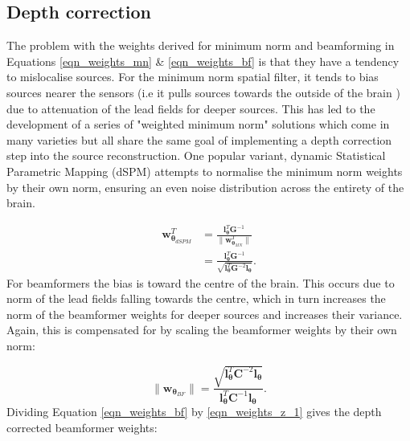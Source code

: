\subsection{Depth correction}\label{sub_depthcorrection}

The problem with the weights derived for minimum norm and beamforming in Equations \ref{eqn_weights_mn} \& \ref{eqn_weights_bf} is that they have a tendency to mislocalise sources. For the minimum norm spatial filter, it tends to bias sources nearer the sensors (i.e it pulls sources towards the outside of the brain \citep{Fuchs1999,Lin2006}) due to attenuation of the lead fields for deeper sources. This has led to the development of a series of "weighted minimum norm" solutions which come in many varieties \citep{Fuchs1999,Dale2000,Pascual-Marqui2002,Lin2006} but all share the same goal of implementing a depth correction step into the source reconstruction. One popular variant, dynamic Statistical Parametric Mapping (dSPM) \citep{Dale2000} attempts to normalise the minimum norm weights by their own norm, ensuring an even noise distribution across the entirety of the brain. 

\begin{equation} \label{eqn_weights_dspm}
	\begin{aligned}
		\mathbf{w}^T_{\mathbf{\theta}_{dSPM}} &= \frac{\mathbf{l}^T_\mathbf{\theta}\mathbf{G}^{-1}}{\big\|\mathbf{w}_{\mathbf{\theta}_{MN}}^T\big\|} \\
		& = \frac{\mathbf{l}^T_\mathbf{\theta}\mathbf{G}^{-1}}{\sqrt{\mathbf{l}^T_\mathbf{\theta}\mathbf{G}^{-2}\mathbf{l}_\mathbf{\theta}}}.
	\end{aligned}
\end{equation} For beamformers the bias is toward the centre of the brain. This occurs due to norm of the lead fields falling towards the centre, which in turn increases the norm of the beamformer weights for deeper sources and increases their variance. Again, this is compensated for by scaling the beamformer weights by their own norm: 

\begin{equation} \label{eqn_weights_z_1}
	\big\|\mathbf{w}_{\mathbf{\theta}_{BF}}\big\| = \frac{\sqrt{\mathbf{l}^T_\mathbf{\theta}\mathbf{C}^{-2}\mathbf{l}_\mathbf{\theta}}}{\mathbf{l}^T_\mathbf{\theta}\mathbf{C}^{-1}\mathbf{l}_\mathbf{\theta}}.
\end{equation} Dividing Equation \ref{eqn_weights_bf} by \ref{eqn_weights_z_1} gives the depth corrected beamformer weights:

